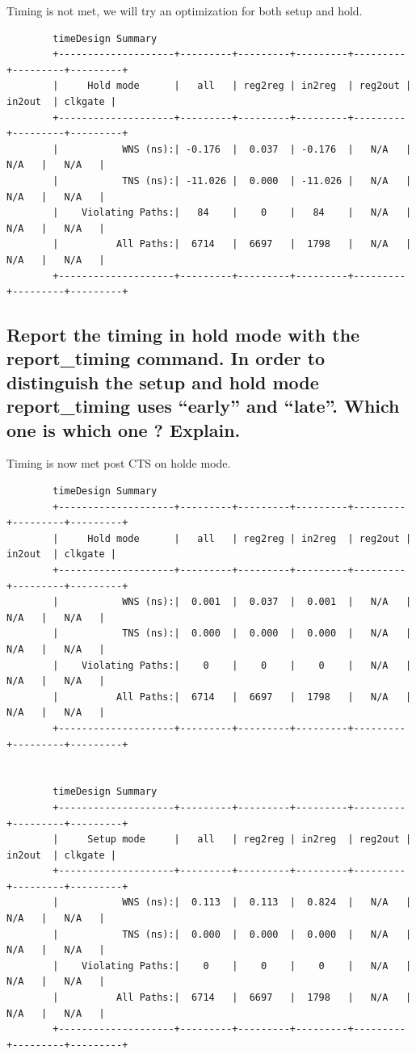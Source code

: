 \documentclass[11pt,a4paper,sans,dvipsnames]{report}
\begin{document}
	Timing is not met, we will try an optimization for both setup and hold.
	\begin{lstlisting}
		timeDesign Summary                             
		+--------------------+---------+---------+---------+---------+---------+---------+
		|     Hold mode      |   all   | reg2reg | in2reg  | reg2out | in2out  | clkgate |
		+--------------------+---------+---------+---------+---------+---------+---------+
		|           WNS (ns):| -0.176  |  0.037  | -0.176  |   N/A   |   N/A   |   N/A   |
		|           TNS (ns):| -11.026 |  0.000  | -11.026 |   N/A   |   N/A   |   N/A   |
		|    Violating Paths:|   84    |    0    |   84    |   N/A   |   N/A   |   N/A   |
		|          All Paths:|  6714   |  6697   |  1798   |   N/A   |   N/A   |   N/A   |
		+--------------------+---------+---------+---------+---------+---------+---------+
	\end{lstlisting}


	\subsection*{Report the timing in hold mode with the report\_timing command. In order to distinguish the setup
		and hold mode report\_timing uses “early” and “late”. Which one is which one ? Explain.}
	Timing is now met post CTS on holde mode.

	\begin{lstlisting}
		timeDesign Summary                             
		+--------------------+---------+---------+---------+---------+---------+---------+
		|     Hold mode      |   all   | reg2reg | in2reg  | reg2out | in2out  | clkgate |
		+--------------------+---------+---------+---------+---------+---------+---------+
		|           WNS (ns):|  0.001  |  0.037  |  0.001  |   N/A   |   N/A   |   N/A   |
		|           TNS (ns):|  0.000  |  0.000  |  0.000  |   N/A   |   N/A   |   N/A   |
		|    Violating Paths:|    0    |    0    |    0    |   N/A   |   N/A   |   N/A   |
		|          All Paths:|  6714   |  6697   |  1798   |   N/A   |   N/A   |   N/A   |
		+--------------------+---------+---------+---------+---------+---------+---------+


		timeDesign Summary                             
		+--------------------+---------+---------+---------+---------+---------+---------+
		|     Setup mode     |   all   | reg2reg | in2reg  | reg2out | in2out  | clkgate |
		+--------------------+---------+---------+---------+---------+---------+---------+
		|           WNS (ns):|  0.113  |  0.113  |  0.824  |   N/A   |   N/A   |   N/A   |
		|           TNS (ns):|  0.000  |  0.000  |  0.000  |   N/A   |   N/A   |   N/A   |
		|    Violating Paths:|    0    |    0    |    0    |   N/A   |   N/A   |   N/A   |
		|          All Paths:|  6714   |  6697   |  1798   |   N/A   |   N/A   |   N/A   |
		+--------------------+---------+---------+---------+---------+---------+---------+
	\end{lstlisting}
\end{document}
